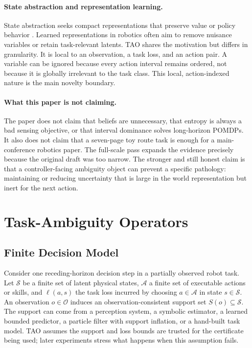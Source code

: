 \documentclass{article}
\newcommand{\states}{\mathcal{S}}
\newcommand{\actions}{\mathcal{A}}
\newcommand{\obs}{\mathcal{O}}
\newcommand{\loss}{\ell}
\begin{document}
\paragraph{State abstraction and representation learning.}
State abstraction seeks compact representations that preserve value or policy behavior \citep{li2006towards,abel2016near}. Learned representations in robotics often aim to remove nuisance variables or retain task-relevant latents. TAO shares the motivation but differs in granularity. It is local to an observation, a task loss, and an action pair. A variable can be ignored because every action interval remains ordered, not because it is globally irrelevant to the task class. This local, action-indexed nature is the main novelty boundary.

\paragraph{What this paper is not claiming.}
The paper does not claim that beliefs are unnecessary, that entropy is always a bad sensing objective, or that interval dominance solves long-horizon POMDPs. It also does not claim that a seven-page toy route task is enough for a main-conference robotics paper. The full-scale pass expands the evidence precisely because the original draft was too narrow. The stronger and still honest claim is that a controller-facing ambiguity object can prevent a specific pathology: maintaining or reducing uncertainty that is large in the world representation but inert for the next action.

\section{Task-Ambiguity Operators}

\subsection{Finite Decision Model}

Consider one receding-horizon decision step in a partially observed robot task. Let $\states$ be a finite set of latent physical states, $\actions$ a finite set of executable actions or skills, and $\loss(a,s)$ the task loss incurred by choosing $a\in\actions$ in state $s\in\states$. An observation $o\in\obs$ induces an observation-consistent support set $S(o)\subseteq\states$. The support can come from a perception system, a symbolic estimator, a learned bounded predictor, a particle filter with support inflation, or a hand-built task model. TAO assumes the support and loss bounds are trusted for the certificate being used; later experiments stress what happens when this assumption fails.
\end{document}
